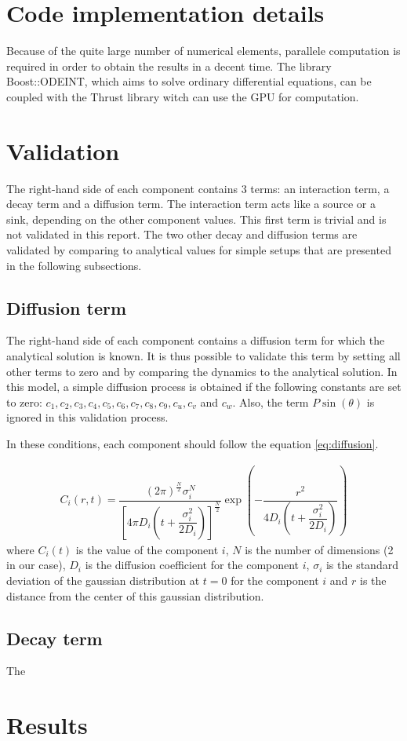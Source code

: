 \documentclass[a4paper]{article}
\begin{document}
\section{Code implementation details}

Because of the quite large number of numerical elements, parallele computation is required in order to obtain the results in a decent time. The library Boost::ODEINT, which aims to solve ordinary differential equations, can be coupled with the Thrust library witch can use the GPU for computation.

\section{Validation}

The right-hand side of each component contains 3 terms: an interaction term, a decay term and a diffusion term. The interaction term acts like a source or a sink, depending on the other component values. This first term is trivial and is not validated in this report. The two other decay and diffusion terms are validated by comparing to analytical values for simple setups that are presented in the following subsections.

\subsection{Diffusion term}

The right-hand side of each component contains a diffusion term for which the analytical solution is known. It is thus possible to validate this term by setting all other terms to zero and by comparing the dynamics to the analytical solution. In this model, a simple diffusion process is obtained if the following constants are set to zero: $c_1, c_2, c_3, c_4, c_5, c_6, c_7, c_8, c_9, c_u, c_v$ and $c_w$.
Also, the term $P \sin (\theta)$ is ignored in this validation process.

In these conditions, each component should follow the equation \ref{eq:diffusion}.

\begin{align}
\label{eq:diffusion}
	C_i(r, t)= \dfrac{ \left( 2 \pi \right) ^\frac{N}{2} \sigma^N_i }{ \left[ 4 \pi D_i \left( t + \dfrac{\sigma^2_i}{2D_i} \right) \right]^\frac{N}{2} } \exp \left(- \dfrac{r^2}{4 D_i \left ( t+ \dfrac{\sigma^2_i}{2D_i} \right) } \right)
\end{align}
where $C_i(t)$ is the value of the component $i$, $N$ is the number of dimensions (2 in our case), $D_i$ is the diffusion coefficient for the component $i$, $\sigma_i$ is the standard deviation of the gaussian distribution at $t=0$ for the component $i$ and $r$ is the distance from the center of this gaussian distribution.


\subsection{Decay term}

The 

\section{Results}



\listoftables
\listoffigures
\end{document}
